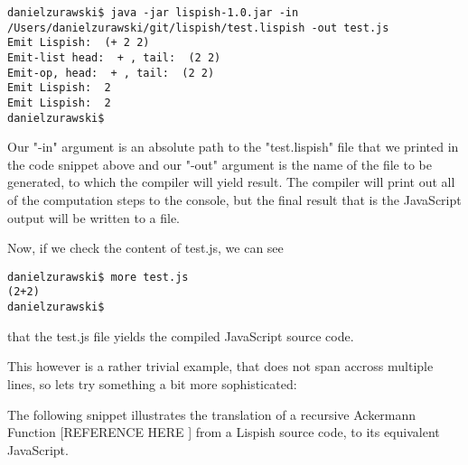 \begin{verbatim}
danielzurawski$ java -jar lispish-1.0.jar -in /Users/danielzurawski/git/lispish/test.lispish -out test.js
Emit Lispish:  (+ 2 2)
Emit-list head:  + , tail:  (2 2)
Emit-op, head:  + , tail:  (2 2)
Emit Lispish:  2
Emit Lispish:  2
danielzurawski$
\end{verbatim}

Our "-in" argument is an absolute path to the "test.lispish" file that we printed in the code snippet above and our "-out" argument is the name of the file to be generated, to which the compiler will yield result. 
The compiler will print out all of the computation steps to the console, but the final result that is the JavaScript output will be written to a file.

Now, if we check the content of test.js, we can see
\begin{verbatim}
danielzurawski$ more test.js
(2+2)
danielzurawski$
\end{verbatim}
that the test.js file yields the compiled JavaScript source code. 

This however is a rather trivial example, that does not span accross multiple lines, so lets try something a bit more sophisticated:

The following snippet illustrates the translation of a recursive Ackermann Function [REFERENCE HERE ] from a Lispish source code, to its equivalent JavaScript. 

